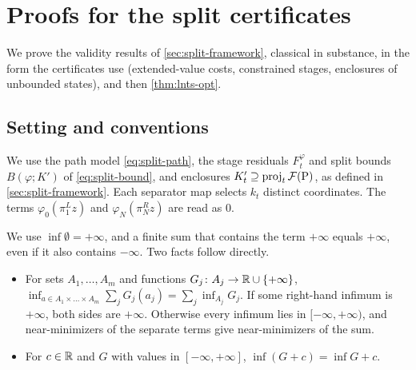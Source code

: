 \section{Proofs for the split certificates}\label{app:splitproofs}

We prove the validity results of \cref{sec:split-framework}, classical in substance, in the form the certificates use (extended-value costs, constrained stages, enclosures of unbounded states), and then \cref{thm:lnts-opt}.

\subsection{Setting and conventions}\label{app:splitproofs-setting}

We use the path model \eqref{eq:split-path}, the stage residuals $F^\varphi_t$
and split bounds $B(\varphi;K')$ of \eqref{eq:split-bound}, and enclosures
$K'_t\supseteq\proj_t\feas[\mathrm P]$, as defined in
\cref{sec:split-framework}.
Each separator map selects $k_t$ distinct coordinates.
The terms $\varphi_0(\pi^L_1z)$ and $\varphi_N(\pi^R_Nz)$ are read as $0$.

We use $\inf\emptyset=+\infty$, and a finite sum that contains the term
$+\infty$ equals $+\infty$, even if it also contains $-\infty$.
Two facts follow directly.
\begin{itemize}
\item[(F1)] For sets $A_1,\dots,A_m$ and functions
  $G_j\colon A_j\to\R\cup\{+\infty\}$,
  $\inf_{a\in A_1\times\dots\times A_m}\sum_j G_j(a_j)=\sum_j\inf_{A_j}G_j$.
  If some right-hand infimum is $+\infty$, both sides are $+\infty$.
  Otherwise every infimum lies in $[-\infty,+\infty)$, and near-minimizers of
  the separate terms give near-minimizers of the sum.
\item[(F2)] For $c\in\R$ and $G$ with values in $[-\infty,+\infty]$,
  $\inf(G+c)=\inf G+c$.
\end{itemize}

